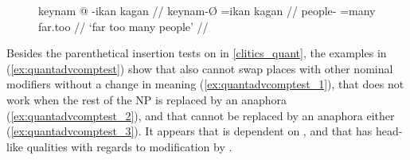 \begin{figure}[h]
\ex\label{ex:clitics_55_short}%
\begingl
	\gla keynam @ -ikan kagan //
	\glb keynam-Ø =ikan kagan //
	\glc people-\Top{} =many far.too //
	\glft `far too many people' //
\endgl%



\xe
\end{figure}

Besides the parenthetical insertion tests on  in
\autoref{clitics_quant}, the examples in (\ref{ex:quantadvcomptest}) show that
 also cannot swap places with other nominal modifiers without
a change in meaning (\ref{ex:quantadvcomptest_1}), that  does
not work when the rest of the NP is replaced by an anaphora
(\ref{ex:quantadvcomptest_2}), and that  cannot be replaced
by an anaphora either (\ref{ex:quantadvcomptest_3}). It appears that
 is dependent on , and that
 has head-like qualities with regards to modification by
.

